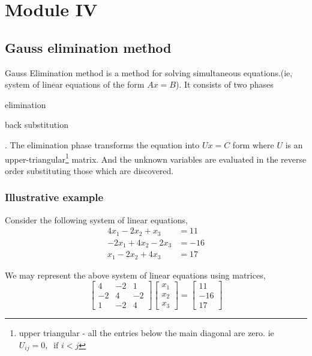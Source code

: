 \chapter{Module IV}
\section{Gauss elimination method}
\par Gauss Elimination method is a method for solving simultaneous equations.(ie, system of linear equations of the form $Ax = B$). It consists of two phases \begin{enumerate*} \item elimination \item back substitution \end{enumerate*}. The elimination phase transforms the equation into $Ux = C$ form where $U$ is an upper-triangular\footnote{upper triangular - all the entries below the main diagonal are zero. ie $U_{ij} = 0,\ \text{ if }i<j$} matrix. And the unknown variables are evaluated in the reverse order substituting those which are discovered.\\

\subsection{Illustrative example}
Consider the following system of linear equations,
\begin{align} 4x_1  - 2x_2  + x_3 & = 11 \label{eqn:a1}\\ -2x_1  + 4x_2 - 2x_3 & = -16 \label{eqn:a2}\\ x_1  - 2x_2 + 4x_3 & = 17 \label{eqn:a3}\end{align} 
\par We may represent the above system of linear equations using matrices,
\[ \begin{bmatrix} 4 & -2 & 1 \\ -2 & 4 & -2 \\ 1 & -2 & 4 \end{bmatrix} \begin{bmatrix} x_1 \\ x_2 \\ x_3 \end{bmatrix} = \begin{bmatrix} 11 \\ -16 \\ 17 \end{bmatrix} \]

